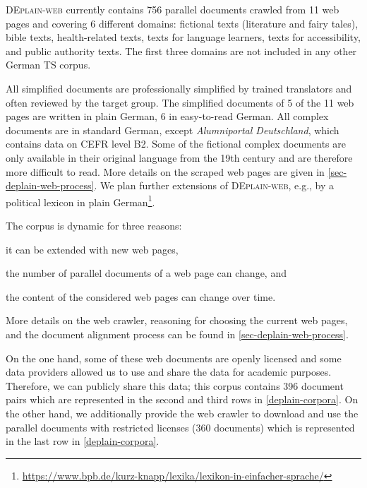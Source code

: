 \documentclass[11pt]{article}
\begin{document}
\textsc{DEplain-web} currently contains 756 parallel documents crawled from 11 web pages and covering 6 different domains: fictional texts (literature and fairy tales), bible texts, health-related texts, texts for language learners, texts for accessibility, and public authority texts. The first three domains are not included in any other German TS corpus. \par
All simplified documents are professionally simplified by trained translators and often 
  reviewed by the target group.  The simplified documents of 5 of the 11 web pages are written in plain German, 6 in 
   easy-to-read German. All complex documents are in standard German, except \emph{Alumniportal Deutschland}, which contains data on CEFR level B2. 
    Some of the fictional complex documents are only available in their original language from the 19th century and are therefore 
     more difficult to read. 
More details on the scraped web pages are given  in 
  \autoref{sec-deplain-web-process}. We plan further extensions of \textsc{DEplain-web}, 
   e.g., by a political lexicon in plain German\footnote{\href{https://www.bpb.de/kurz-knapp/lexika/lexikon-in-einfacher-sprache/}{https://www.bpb.de/kurz-knapp/lexika/lexikon-in-einfacher-sprache/}}. \par
   The corpus is dynamic for three reasons: 
  \begin{enumerate*}[label=\roman*)]
      \item it can be extended with new web pages, 
      \item the number of parallel documents of a web page can change, and
      \item the content of the considered web pages can change over time.
  \end{enumerate*} 
    More details on the web crawler, reasoning for choosing the current web pages, and the document alignment process can be found in \autoref{sec-deplain-web-process}.\par


On the one hand, some of these web documents are openly licensed and some data providers allowed us to use and share the data for academic purposes. Therefore, we can publicly share this data; this corpus contains 396 document pairs which are represented in the second and third rows in \autoref{deplain-corpora}. On the other hand, we additionally provide the web crawler to download and use the parallel documents with restricted licenses (360 documents) which is represented in the last row in \autoref{deplain-corpora}. \par
\end{document}
